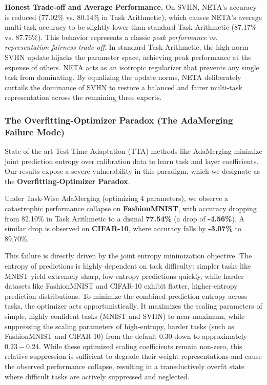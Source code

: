 \textbf{Honest Trade-off and Average Performance.} On SVHN, NETA's accuracy is reduced (77.02\% vs. 80.14\% in Task Arithmetic), which causes NETA's average multi-task accuracy to be slightly lower than standard Task Arithmetic (87.17\% vs. 87.76\%). This behavior represents a classic \textit{peak performance vs. representation fairness trade-off}. In standard Task Arithmetic, the high-norm SVHN update hijacks the parameter space, achieving peak performance at the expense of others. NETA acts as an isotropic regularizer that prevents any single task from dominating. By equalizing the update norms, NETA deliberately curtails the dominance of SVHN to restore a balanced and fairer multi-task representation across the remaining three experts.

\subsubsection{The Overfitting-Optimizer Paradox (The AdaMerging Failure Mode)}
State-of-the-art Test-Time Adaptation (TTA) methods like AdaMerging minimize joint prediction entropy over calibration data to learn task and layer coefficients. Our results expose a severe vulnerability in this paradigm, which we designate as the \textbf{Overfitting-Optimizer Paradox}.

Under Task-Wise AdaMerging (optimizing 4 parameters), we observe a catastrophic performance collapse on \textbf{FashionMNIST}, with accuracy dropping from 82.10\% in Task Arithmetic to a dismal \textbf{77.54\%} (a drop of \textbf{-4.56\%}). A similar drop is observed on \textbf{CIFAR-10}, where accuracy falls by \textbf{-3.07\%} to 89.70\%.

This failure is directly driven by the joint entropy minimization objective. The entropy of predictions is highly dependent on task difficulty: simpler tasks like MNIST yield extremely sharp, low-entropy predictions quickly, while harder datasets like FashionMNIST and CIFAR-10 exhibit flatter, higher-entropy prediction distributions. To minimize the combined prediction entropy across tasks, the optimizer acts opportunistically. It maximizes the scaling parameters of simple, highly confident tasks (MNIST and SVHN) to near-maximum, while suppressing the scaling parameters of high-entropy, harder tasks (such as FashionMNIST and CIFAR-10) from the default $0.30$ down to approximately $0.23 - 0.24$. While these optimized scaling coefficients remain non-zero, this relative suppression is sufficient to degrade their weight representations and cause the observed performance collapse, resulting in a transductively overfit state where difficult tasks are actively suppressed and neglected.

